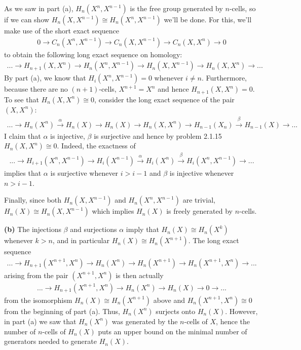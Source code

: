 \begin{homework}[e]
\begin{prf}
    As we saw in part (a), $H_n(X^n,X^{n-1})$ is the free group generated by $n$-cells, so if we can show $H_n(X,X^{n-1}) \cong H_n(X^n,X^{n-1})$ we'll be done. For this, we'll make use of the short exact sequence 
    \begin{align*}
      0 \to C_n(X^n,X^{n-1}) \to C_n(X,X^{n-1}) \to C_n(X,X^n) \to 0
    \end{align*}
    to obtain the following long exact sequence on homology:
    \begin{align*}
      ... \to H_{n+1}(X,X^n) \to H_n(X^n,X^{n-1}) \to H_n(X,X^{n-1}) \to H_n(X,X^{n}) \to ...
    \end{align*}
    By part (a), we know that $H_i(X^n,X^{n-1}) = 0$ whenever $i \neq n$. Furthermore, because there are no $(n+1)$-cells, $X^{n+1} = X^n$ and hence $H_{n+1}(X,X^n) = 0$. To see that $H_n(X,X^n) \cong 0$, consider the long exact sequence of the pair $(X,X^n)$:
    \begin{align*}
      ... \to H_n(X^n) \xrightarrow{\alpha} H_n(X) \to H_n(X)\to H_n(X,X^n) \to H_{n-1}(X_n) \xrightarrow{\beta} H_{n-1}(X) \to ...
    \end{align*}
    I claim that $\alpha$ is injective, $\beta$ is surjective and hence by problem 2.1.15 $H_n(X,X^n) \cong 0$. Indeed, the exactness of
    \begin{align*}
      ... \to H_{i+1}(X^n,X^{n-1}) \to H_i(X^{n-1}) \xrightarrow{\alpha} H_i(X^{n}) \xrightarrow{\beta} H_i(X^n,X^{n-1}) \to ...
    \end{align*}
    implies that $\alpha$ is surjective whenever $i > i - 1$ and $\beta$ is injective whenever $n > i - 1$.

    Finally, since both $H_{n}(X,X^{n-1})$ and $H_n(X^n,X^{n-1})$ are trivial, $H_n(X) \cong H_n(X,X^{n-1})$ which implies $H_n(X)$ is freely generated by $n$-cells.

    \bigskip

    \noindent \textbf{(b)}\hspace{1em} The injections $\beta$ and surjections $\alpha$ imply that $H_n(X) \cong H_n(X^k)$ whenever $k > n$, and in particular $H_n(X) \cong H_{n}(X^{n+1})$. The long exact sequence
    \begin{align*}
      ... \to H_{n+1}(X^{n+1},X^n) \to H_n(X^n) \to H_n(X^{n+1}) \to H_n(X^{n+1},X^n) \to ...
    \end{align*}
    arising from the pair $(X^{n+1},X^n)$ is then actually
    \begin{align*}
      ... \to H_{n+1}(X^{n+1},X^n) \to H_n(X^n) \to H_n(X) \to 0 \to ...
    \end{align*}
    from the isomorphism $H_n(X) \cong H_n(X^{n+1})$ above and $H_n(X^{n+1},X^n)\cong 0$ from the beginning of part (a). Thus, $H_n(X^n)$ surjects onto $H_n(X)$. However, in part (a) we saw that $H_n(X^n)$ was generated by the $n$-cells of $X$, hence the number of $n$-cells of $H_n(X)$ puts an upper bound on the minimal number of generators needed to generate $H_n(X)$.
  \end{prf}
\end{homework}
